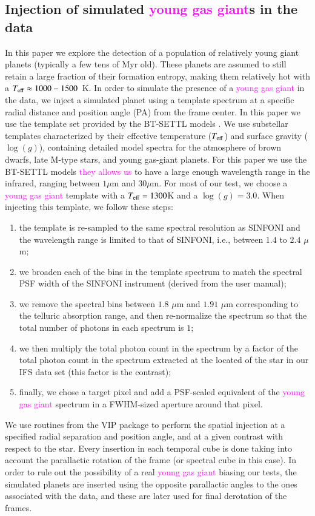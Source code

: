\documentclass[referee]{aa} %
\newcommand{\newchange}[1]{\textcolor{magenta}{#1}}
\begin{document}
\subsection{Injection of simulated \newchange{young gas giant}s in the data}\label{sec: FC insertion}

In this paper we explore the detection of a population of relatively young giant planets (typically a few tens of Myr old). These planets are assumed to still retain a large fraction of their formation entropy, making them relatively hot with a $T_{\rm eff}\approx 1000 - 1500$~K.
In order to simulate the presence of a \newchange{young gas giant} in the data, we inject a simulated planet using a template spectrum at a specific radial distance and position angle (PA) from the frame center.
In this paper we use the template set provided by the BT-SETTL models \citep{1997Allard, 2011Allard,2003BTsettl}.%
We use substellar templates characterized by their effective temperature ($T_{\rm{eff}}$) and surface gravity ($\log(g)$), containing detailed model spectra for the atmosphere of brown dwarfs, late M-type stars, and young gas-giant planets.
For this paper we use the BT-SETTL models \newchange{they allows us} to have a large enough wavelength range in the infrared, ranging between $1\mu$m and $30\mu$m.
For most of our test, we choose a \newchange{young gas giant} template with a $T_{\rm eff} = 1300$K and a $\log(g)=3.0$.
When injecting this template, we follow these steps:
\begin{enumerate}
    \item the template is re-sampled to the same spectral resolution as SINFONI and the wavelength range is limited to that of SINFONI, i.e., between $1.4$ to $2.4$ $\mu$m;
    \item we broaden each of the bins in the template spectrum to match the spectral PSF width of the SINFONI instrument (derived from the user manual);
    \item we remove the spectral bins between $1.8$ $\mu$m and $1.91$ $\mu$m corresponding to the telluric absorption range, and then re-normalize the spectrum so that the total number of photons in each spectrum is $1$;
    \item we then multiply the total photon count in the spectrum by a factor of the total photon count in the spectrum extracted at the located of the star in our IFS data set (this factor is the contrast);
    \item finally, we chose a target pixel and add a PSF-scaled equivalent of the \newchange{young gas giant} spectrum in a FWHM-sized aperture around that pixel.
\end{enumerate}
We use routines from the \textsc{VIP} package to perform the spatial injection at a specified radial separation and position angle, and at a given contrast with respect to the star.
Every insertion in each temporal cube is done taking into account the parallactic rotation of the frame (or spectral cube in this case).
In order to rule out the possibility of a real \newchange{young gas giant} biasing our tests, the simulated planets are inserted using the opposite parallactic angles to the ones associated with the data, and these are later used for final derotation of the frames.
\end{document}
